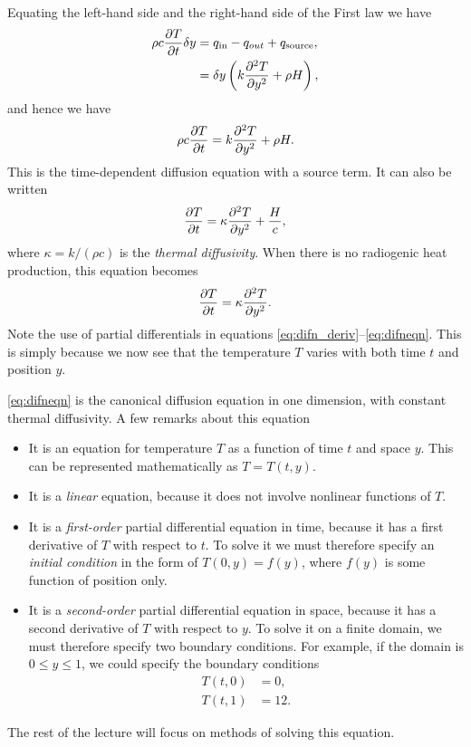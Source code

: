 \documentclass[11pt,twoside,a4paper]{article}
\begin{document}
Equating the left-hand side and the right-hand side of the First law
we have
\begin{align}
  \label{eq:difn_deriv}
  \rho c \frac{\partial T}{\partial t}\delta y &= q_\text{in} - q_{out} + q_\text{source},\nonumber\\
                              &= \delta y \left(k\frac{\partial^2 {T}}{\partial {y}^2} + \rho H\right),
\end{align}
and hence we have
\begin{displaymath}
  \rho c \frac{\partial T}{\partial t} = k\frac{\partial^2 {T}}{\partial {y}^2} + \rho H.
\end{displaymath}
This is the time-dependent diffusion equation with a source term.  It
can also be written
\begin{equation}
  \label{eq:difneqn_source}
  \frac{\partial T}{\partial t} = \kappa\frac{\partial^2 {T}}{\partial {y}^2} + \frac{H}{c},
\end{equation}
where $\kappa = k/(\rho c)$ is the \textit{thermal diffusivity}.  When
there is no radiogenic heat production, this equation becomes
\begin{equation}
  \label{eq:difneqn}
  \frac{\partial T}{\partial t} = \kappa\frac{\partial^2 {T}}{\partial {y}^2}.
\end{equation}
Note the use of partial differentials in equations
\eqref{eq:difn_deriv}--\eqref{eq:difneqn}.  This is simply because we
now see that the temperature $T$ varies with both time $t$ and
position $y$.

\autoref{eq:difneqn} is the canonical diffusion equation in one
dimension, with constant thermal diffusivity. A few remarks about this
equation
\begin{itemize}
\item It is an equation for temperature $T$ as a function of time $t$
  and space $y$.  This can be represented mathematically as
  $T=T(t,y)$.
\item It is a \textit{linear} equation, because it does not involve
  nonlinear functions of $T$.
\item It is a \textit{first-order} partial differential equation in
  time, because it has a first derivative of $T$ with respect to
  $t$. To solve it we must therefore specify an \textit{initial
    condition} in the form of $T(0,y) = f(y)$, where $f(y)$ is some
  function of position only.
\item It is a \textit{second-order} partial differential equation in
  space, because it has a second derivative of $T$ with respect to
  $y$.  To solve it on a finite domain, we must therefore specify two
  boundary conditions.  For example, if the domain is $0\le y \le 1$,
  we could specify the boundary conditions
  \begin{subequations}
    \begin{align}
      T(t,0) &= 0,\\
      T(t,1) &= 12.
    \end{align}
  \end{subequations}
\end{itemize}
The rest of the lecture will focus on methods of solving this
equation.
\end{document}
